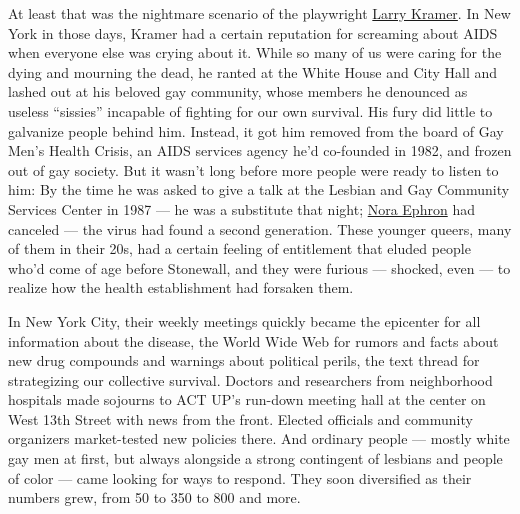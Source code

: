 At least that was the nightmare scenario of the playwright
\href{https://www.nytimes.com/2020/03/28/nyregion/coronavirus-larry-kramer-aids.html}{Larry
Kramer}. In New York in those days, Kramer had a certain reputation for
screaming about AIDS when everyone else was crying about it. While so
many of us were caring for the dying and mourning the dead, he ranted at
the White House and City Hall and lashed out at his beloved gay
community, whose members he denounced as useless ``sissies'' incapable
of fighting for our own survival. His fury did little to galvanize
people behind him. Instead, it got him removed from the board of Gay
Men's Health Crisis, an AIDS services agency he'd co-founded in 1982,
and frozen out of gay society. But it wasn't long before more people
were ready to listen to him: By the time he was asked to give a talk at
the Lesbian and Gay Community Services Center in 1987 --- he was a
substitute that night;
\href{https://www.nytimes.com/topic/person/nora-ephron}{Nora Ephron} had
canceled --- the virus had found a second generation. These younger
queers, many of them in their 20s, had a certain feeling of entitlement
that eluded people who'd come of age before Stonewall, and they were
furious --- shocked, even --- to realize how the health establishment
had forsaken them.

In New York City, their weekly meetings quickly became the epicenter for
all information about the disease, the World Wide Web for rumors and
facts about new drug compounds and warnings about political perils, the
text thread for strategizing our collective survival. Doctors and
researchers from neighborhood hospitals made sojourns to ACT UP's
run-down meeting hall at the center on West 13th Street with news from
the front. Elected officials and community organizers market-tested new
policies there. And ordinary people --- mostly white gay men at first,
but always alongside a strong contingent of lesbians and people of color
--- came looking for ways to respond. They soon diversified as their
numbers grew, from 50 to 350 to 800 and more.

